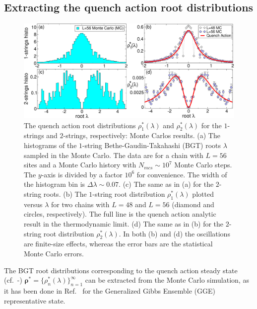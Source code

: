 \documentclass[11pt]{iopart}
\begin{document}
\subsection{Extracting the quench action root distributions}
\label{sec:6.3}

\begin{figure}[t]
\begin{center}
\includegraphics[width=.95\textwidth]{./draft_figs/Neel_rho}
\end{center}
\caption{ The quench action root distributions $\rho^*_1(\lambda)$ and 
 $\rho^*_2(\lambda)$ for the $1$-strings and $2$-strings, respectively: Monte 
 Carlos results. (a) The histograms of the $1$-string Bethe-Gaudin-Takahashi 
 (BGT) roots $\lambda$ sampled in the Monte Carlo. The data are for a chain 
 with $L=56$ sites and a Monte Carlo history with $N_{mcs}\sim 10^7$ Monte 
 Carlo steps. The $y$-axis is divided by a factor $10^6$ for convenience. 
 The width of the histogram bin is $\Delta\lambda\sim 0.07$. (c) The same as 
 in (a) for the $2$-string roots. (b) The $1$-string root distribution 
 $\rho^*_1(\lambda)$ plotted versus $\lambda$ for two chains with $L=48$ 
 and $L=56$ (diamond and circles, respectively). The full line 
 is the quench action analytic result in the thermodynamic limit. (d) 
 The same as in (b) for the $2$-string root distribution $\rho^*_2(\lambda)$. 
 In both (b) and (d) the oscillations are finite-size effects, whereas 
 the error bars are the statistical Monte Carlo errors. 
}
\label{fig4:neel-rho}
\end{figure}

The BGT root distributions corresponding to the quench action steady state 
(cf.~-) $\pmb{\rho^*}=\{\rho^*_n(\lambda)\}_{n=
1}^{\infty}$ can be extracted from the Monte Carlo simulation,  as it has been 
done in Ref.~\cite{alba-2015} for the Generalized Gibbs Ensemble (GGE) 
representative state. 
\end{document}

